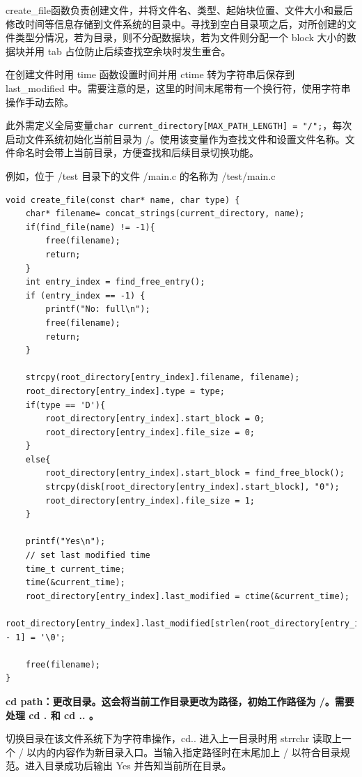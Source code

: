 \documentclass{article}
\begin{document}
create\_file函数负责创建文件，并将文件名、类型、起始块位置、文件大小和最后修改时间等信息存储到文件系统的目录中。寻找到空白目录项之后，对所创建的文件类型分情况，若为目录，则不分配数据块，若为文件则分配一个 block 大小的数据块并用 tab 占位防止后续查找空余块时发生重合。

在创建文件时用 time 函数设置时间并用 ctime 转为字符串后保存到 last\_modified 中。需要注意的是，这里的时间末尾带有一个换行符，使用字符串操作手动去除。

此外需定义全局变量\verb|char current_directory[MAX_PATH_LENGTH] = "/";|，每次启动文件系统初始化当前目录为 /。使用该变量作为查找文件和设置文件名称。文件命名时会带上当前目录，方便查找和后续目录切换功能。

例如，位于 /test 目录下的文件 /main.c 的名称为 /test/main.c

\begin{lstlisting}
void create_file(const char* name, char type) {
    char* filename= concat_strings(current_directory, name);
    if(find_file(name) != -1){
        free(filename);
        return;
    } 
    int entry_index = find_free_entry();
    if (entry_index == -1) {
        printf("No: full\n");
        free(filename);
        return;
    }

    strcpy(root_directory[entry_index].filename, filename);
    root_directory[entry_index].type = type;
    if(type == 'D'){
        root_directory[entry_index].start_block = 0;
        root_directory[entry_index].file_size = 0;
    }
    else{
        root_directory[entry_index].start_block = find_free_block();
        strcpy(disk[root_directory[entry_index].start_block], "0");
        root_directory[entry_index].file_size = 1;
    }

    printf("Yes\n");
    // set last modified time
    time_t current_time;
    time(&current_time);
    root_directory[entry_index].last_modified = ctime(&current_time);
    root_directory[entry_index].last_modified[strlen(root_directory[entry_index].last_modified) - 1] = '\0';
    
    free(filename);
}
\end{lstlisting}

\noindent\textbf{cd path：更改目录。这会将当前工作目录更改为路径，初始工作路径为 /。需要处理 cd . 和 cd .. 。}

切换目录在该文件系统下为字符串操作，cd.. 进入上一目录时用 strrchr 读取上一个 / 以内的内容作为新目录入口。当输入指定路径时在末尾加上 / 以符合目录规范。进入目录成功后输出 Yes 并告知当前所在目录。
\end{document}
